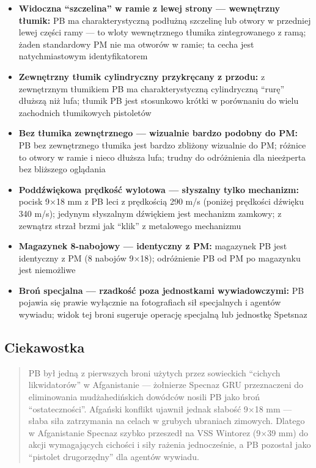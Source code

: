 \documentclass[12pt,oneside]{book}
\providecommand{\tightlist}{%
  \setlength{\itemsep}{0pt}\setlength{\parskip}{0pt}}
\begin{document}
\begin{itemize}
\tightlist
\item
  \textbf{Widoczna ``szczelina'' w ramie z lewej strony --- wewnętrzny
  tłumik:} PB ma charakterystyczną podłużną szczelinę lub otwory w
  przedniej lewej części ramy --- to wloty wewnętrznego tłumika
  zintegrowanego z ramą; żaden standardowy PM nie ma otworów w ramie; ta
  cecha jest natychmiastowym identyfikatorem
\item
  \textbf{Zewnętrzny tłumik cylindryczny przykręcany z przodu:} z
  zewnętrznym tłumikiem PB ma charakterystyczną cylindryczną ``rurę''
  dłuższą niż lufa; tłumik PB jest stosunkowo krótki w porównaniu do
  wielu zachodnich tłumikowych pistoletów
\item
  \textbf{Bez tłumika zewnętrznego --- wizualnie bardzo podobny do PM:}
  PB bez zewnętrznego tłumika jest bardzo zbliżony wizualnie do PM;
  różnice to otwory w ramie i nieco dłuższa lufa; trudny do odróżnienia
  dla nieeżperta bez bliższego oglądania
\item
  \textbf{Poddźwiękowa prędkość wylotowa --- słyszalny tylko mechanizm:}
  pocisk 9×18 mm z PB leci z prędkością 290 m/s (poniżej prędkości
  dźwięku 340 m/s); jedynym słyszalnym dźwiękiem jest mechanizm zamkowy;
  z zewnątrz strzał brzmi jak ``klik'' z metalowego mechanizmu
\item
  \textbf{Magazynek 8-nabojowy --- identyczny z PM:} magazynek PB jest
  identyczny z PM (8 nabojów 9×18); odróżnienie PB od PM po magazynku
  jest niemożliwe
\item
  \textbf{Broń specjalna --- rzadkość poza jednostkami wywiadowczymi:}
  PB pojawia się prawie wyłącznie na fotografiach sił specjalnych i
  agentów wywiadu; widok tej broni sugeruje operację specjalną lub
  jednostkę Spetsnaz
\end{itemize}

\subsection{Ciekawostka}\label{ciekawostka-104}

\begin{quote}
PB był jedną z pierwszych broni użytych przez sowieckich ``cichych
likwidatorów'' w Afganistanie --- żołnierze Specnaz GRU przeznaczeni do
eliminowania mudżahedińskich dowódców nosili PB jako broń
``ostateczności''. Afgański konflikt ujawnił jednak słabość 9×18 mm ---
słaba siła zatrzymania na celach w grubych ubraniach zimowych. Dlatego w
Afganistanie Specnaz szybko przeszedł na VSS Wintorez (9×39 mm) do akcji
wymagających cichości i siły rażenia jednocześnie, a PB pozostał jako
``pistolet drugorzędny'' dla agentów wywiadu.
\end{quote}
\end{document}
